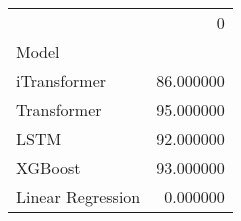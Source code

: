 \begin{tabular}{lr}
\toprule
 & 0 \\
Model &  \\
\midrule
iTransformer & 86.000000 \\
Transformer & 95.000000 \\
LSTM & 92.000000 \\
XGBoost & 93.000000 \\
Linear Regression & 0.000000 \\
\bottomrule
\end{tabular}
